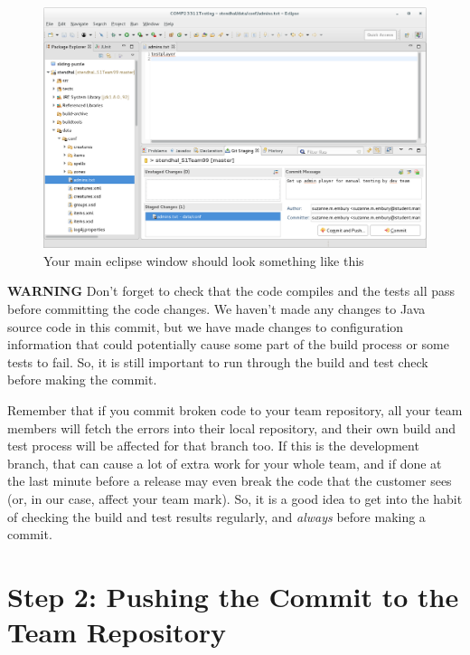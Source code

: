 \documentclass[
]{book}
\begin{document}
\begin{figure}

{\centering \includegraphics[width=1\linewidth]{images/fileStagedForCommit} 

}

\caption{Your main eclipse window should look something like this}\label{fig:fileStagedForCommit-fig}
\end{figure}

\textbf{WARNING}
Don't forget to check that the code compiles and the tests all pass before committing the code changes. We haven't made any changes to Java source code in this commit, but we have made changes to configuration information that could potentially cause some part of the build process or some tests to fail. So, it is still important to run through the build and test check before making the commit.

Remember that if you commit broken code to your team repository, all your team members will fetch the errors into their local repository, and their own build and test process will be affected for that branch too. If this is the development branch, that can cause a lot of extra work for your whole team, and if done at the last minute before a release may even break the code that the customer sees (or, in our case, affect your team mark). So, it is a good idea to get into the habit of checking the build and test results regularly, and \emph{always} before making a commit.

\hypertarget{pushing}{%
\section{Step 2: Pushing the Commit to the Team Repository}\label{pushing}}
\end{document}
